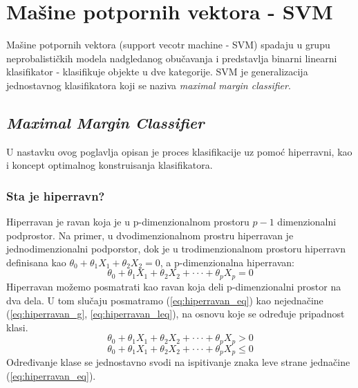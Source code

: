 \section{Mašine potpornih vektora - SVM}
Mašine potpornih vektora (support vecotr machine - SVM) spadaju u grupu neprobalističkih modela nadgledanog obučavanja i
predstavlja binarni linearni klasifikator - klasifikuje objekte u dve kategorije. SVM je generalizacija jednostavnog klasifikatora koji se naziva
\textit{maximal margin classifier}.

\subsection{\textit{Maximal Margin Classifier}}
U nastavku ovog poglavlja opisan je proces klasifikacije uz pomoć hiperravni, kao i koncept optimalnog konstruisanja klasifikatora.
\subsubsection{Sta je hiperravn?}
Hiperravan je ravan koja je u p-dimenzionalnom prostoru $p-1$ dimenzionalni podprostor. Na primer,
u dvodimenzionalnom prostru hiperravan je jednodimenzionalni podporstor, dok je u trodimenzionalnom prostoru
hiperravn definisana kao $\theta_0 + \theta_1X_1 + \theta_2X_2 = 0$, a p-dimenzionalna hiperravan:
\begin{equation} \label{eq:hiperravan_eq}
  \theta_0 + \theta_1X_1 + \theta_2X_2 + \cdot\cdot\cdot + \theta_pX_p = 0
\end{equation}
Hiperravan možemo posmatrati kao ravan koja deli p-dimenzionalni prostor na dva
dela. U tom slučaju posmatramo (\ref{eq:hiperravan_eq}) kao nejednačine (\ref{eq:hiperravan_g}, \ref{eq:hiperravan_leq}), na osnovu koje
se određuje pripadnost klasi.
\begin{equation} \label{eq:hiperravan_g}
  \theta_0 + \theta_1X_1 + \theta_2X_2 + \cdot\cdot\cdot + \theta_pX_p > 0
\end{equation}
\begin{equation} \label{eq:hiperravan_leq}
  \theta_0 + \theta_1X_1 + \theta_2X_2 + \cdot\cdot\cdot + \theta_pX_p \leq 0
\end{equation}
Određivanje klase se jednostavno svodi na ispitivanje znaka leve strane
jednačine (\ref{eq:hiperravan_eq}).


